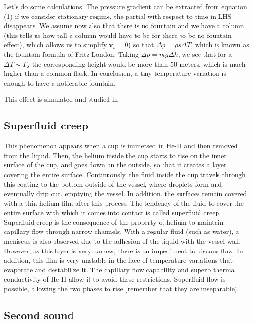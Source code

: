 \documentclass{article}
\begin{document}
Let's do some calculations. The pressure gradient can be extracted from equation (1) if we consider stationary regime, the partial with respect to time in LHS disappears. We assume now also that there is no fountain and we have a column (this tells us how tall a column would have to be for there to be no fountain effect), which allows us to simplify $\mathbf{v}_s = 0$) so that $\Delta p = \rho s \Delta T$, which is known as the fountain formula of Fritz London. Taking $\Delta p = mg \Delta h$, we see that for a $\Delta T \sim T_\lambda$ the corresponding height would be more than 50 meters, which is much higher than a common flask. In conclusion, a tiny temperature variation is enough to have a noticeable fountain.

This effect is simulated and studied in \cite{Kincl}

\subsection{Superfluid creep}

This phenomenon appears when a cup is immersed in He-II and then removed from the liquid. Then, the helium inside the cup starts to rise on the inner surface of the cup, and goes down on the outside, so that it creates a layer covering the entire surface. Continuously, the fluid inside the cup travels through this coating to the bottom outside of the vessel, where droplets form and eventually drip out, emptying the vessel. In addition, the surfaces remain covered with a thin helium film after this process. The tendency of the fluid to cover the entire surface with which it comes into contact is called superfluid creep.
\\

Superfluid creep is the consequence of the property of helium to maintain capillary flow through narrow channels. With a regular fluid (such as water), a meniscus is also observed due to the adhesion of the liquid with the vessel wall. However, as this layer is very narrow, there is an impediment to viscous flow. In addition, this film is very unstable in the face of temperature variations that evaporate and destabilize it. The capillary flow capability and superb thermal conductivity of He-II allow it to avoid these restrictions. Superfluid flow is possible, allowing the two phases to rise (remember that they are inseparable).
\\

\subsection{Second sound}
\end{document}
